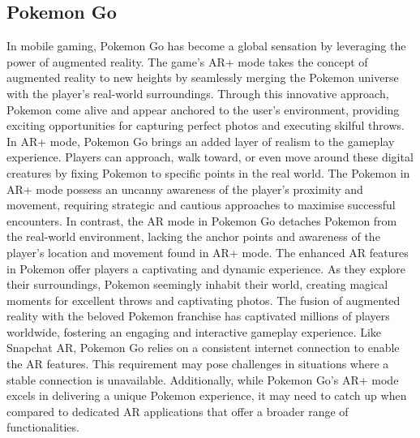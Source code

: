 \subsection*{Pokemon Go}
In mobile gaming, Pokemon Go has become a global sensation by leveraging the power of augmented reality. The game's AR+ mode takes the concept of augmented reality to new heights by seamlessly merging the Pokemon universe with the player's real-world surroundings. Through this innovative approach, Pokemon come alive and appear anchored to the user's environment, providing exciting opportunities for capturing perfect photos and executing skilful throws.
In AR+ mode, Pokemon Go brings an added layer of realism to the gameplay experience. Players can approach, walk toward, or even move around these digital creatures by fixing Pokemon to specific points in the real world. The Pokemon in AR+ mode possess an uncanny awareness of the player's proximity and movement, requiring strategic and cautious approaches to maximise successful encounters.
In contrast, the AR mode in Pokemon Go detaches Pokemon from the real-world environment, lacking the anchor points and awareness of the player's location and movement found in AR+ mode.
The enhanced AR features in Pokemon offer players a captivating and dynamic experience. As they explore their surroundings, Pokemon seemingly inhabit their world, creating magical moments for excellent throws and captivating photos. The fusion of augmented reality with the beloved Pokemon franchise has captivated millions of players worldwide, fostering an engaging and interactive gameplay experience.
Like Snapchat AR, Pokemon Go relies on a consistent internet connection to enable the AR features. This requirement may pose challenges in situations where a stable connection is unavailable. Additionally, while Pokemon Go's AR+ mode excels in delivering a unique Pokemon experience, it may need to catch up when compared to dedicated AR applications that offer a broader range of functionalities.

